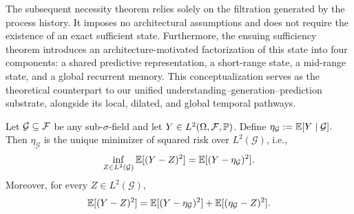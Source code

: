 \begin{remark}
\label{rem:scope_of_two_results}
The subsequent necessity theorem relies solely on the filtration generated by the process history. It imposes no architectural assumptions and does not require the existence of an exact sufficient state. Furthermore, the ensuing sufficiency theorem introduces an architecture-motivated factorization of this state into four components: a shared predictive representation, a short-range state, a mid-range state, and a global recurrent memory. This conceptualization serves as the theoretical counterpart to our unified understanding--generation--prediction substrate, alongside its local, dilated, and global temporal pathways.
\end{remark}















\begin{lemma}
\label{lem:l2_projection}
Let $\mathcal G \subseteq \mathcal{F}$ be any sub-$\sigma$-field and let $Y\in L^2(\Omega,\mathcal{F},\mathbb{P})$.
Define $\eta_{\mathcal G} := \mathbb{E}[Y\mid \mathcal G].$ Then $\eta_{\mathcal G}$ is the unique minimizer of squared risk over $L^2(\mathcal G)$, i.e.,
\begin{equation}
\inf_{Z \in L^2(\mathcal G)} \mathbb{E}[(Y-Z)^2]
=
\mathbb{E}[(Y-\eta_{\mathcal G})^2].
\label{eq:l2_projection_statement}
\end{equation}
Moreover, for every $Z\in L^2(\mathcal G)$,
\begin{equation}
\mathbb{E}[(Y-Z)^2]
=
\mathbb{E}[(Y-\eta_{\mathcal G})^2]
+
\mathbb{E}[(\eta_{\mathcal G}-Z)^2].
\label{eq:pythagorean_identity}
\end{equation}
\end{lemma}

